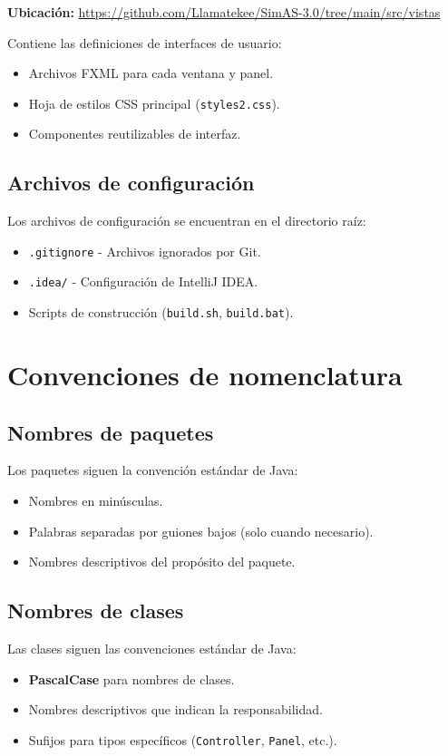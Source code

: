 \textbf{Ubicación:} \url{https://github.com/Llamatekee/SimAS-3.0/tree/main/src/vistas}

Contiene las definiciones de interfaces de usuario:
\begin{itemize}
    \item Archivos FXML para cada ventana y panel.
    \item Hoja de estilos CSS principal (\texttt{styles2.css}).
    \item Componentes reutilizables de interfaz.
\end{itemize}

\subsection{Archivos de configuración}

Los archivos de configuración se encuentran en el directorio raíz:
\begin{itemize}
    \item \texttt{.gitignore} - Archivos ignorados por Git.
    \item \texttt{.idea/} - Configuración de IntelliJ IDEA.
    \item Scripts de construcción (\texttt{build.sh}, \texttt{build.bat}).
\end{itemize}

\section{Convenciones de nomenclatura}

\subsection{Nombres de paquetes}

Los paquetes siguen la convención estándar de Java:
\begin{itemize}
    \item Nombres en minúsculas.
    \item Palabras separadas por guiones bajos (solo cuando necesario).
    \item Nombres descriptivos del propósito del paquete.
\end{itemize}

\subsection{Nombres de clases}

Las clases siguen las convenciones estándar de Java:
\begin{itemize}
    \item \textbf{PascalCase} para nombres de clases.
    \item Nombres descriptivos que indican la responsabilidad.
    \item Sufijos para tipos específicos (\texttt{Controller}, \texttt{Panel}, etc.).
\end{itemize}

